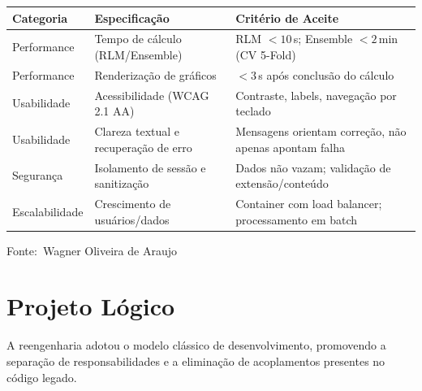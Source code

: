 \documentclass[12pt,a4paper]{article}
\newcommand{\oautor}{Wagner Oliveira de Araujo}
\begin{document}
\begin{quadro}[ht]
\centering
\small
\caption{Especificação de requisitos não funcionais}
\label{quadro:nao-funcionais}
\begin{threeparttable}
\begin{tabularx}{\textwidth}{|l|X|X|} \hline
\textbf{Categoria} & \textbf{Especificação} & \textbf{Critério de Aceite} \\ \hline
Performance & Tempo de cálculo (RLM/Ensemble) & RLM $< 10\,$s; Ensemble $< 2\,$min (CV 5-Fold) \\ \hline
Performance & Renderização de gráficos & $< 3\,$s após conclusão do cálculo \\ \hline
Usabilidade & Acessibilidade (WCAG 2.1 AA) & Contraste, labels, navegação por teclado \\ \hline
Usabilidade & Clareza textual e recuperação de erro & Mensagens orientam correção, não apenas apontam falha \\ \hline
Segurança & Isolamento de sessão e sanitização & Dados não vazam; validação de extensão/conteúdo \\ \hline
Escalabilidade & Crescimento de usuários/dados & Container com load balancer; processamento em batch \\ \hline
\end{tabularx}
\begin{tablenotes}[flushleft]
\footnotesize
\item Fonte:~\oautor
\end{tablenotes}
\end{threeparttable}
\end{quadro}

\section{Projeto Lógico}

A reengenharia adotou o modelo clássico de desenvolvimento, promovendo a separação de responsabilidades e a eliminação de acoplamentos presentes no código legado.
\end{document}
